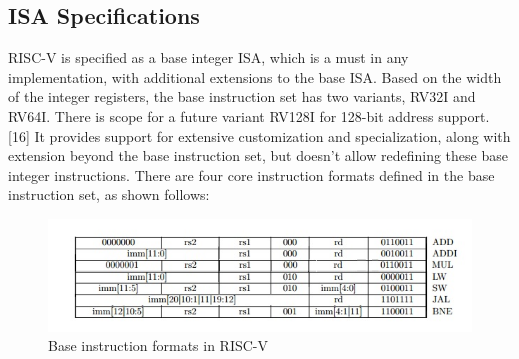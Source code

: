 \subsection{ISA Specifications}
 \label{sect6_1_2}
RISC-V is specified as a base integer ISA, which is a must in any implementation, with additional extensions to the base ISA. Based on the width of the integer registers, the base instruction set has two variants, RV32I and RV64I. There is scope for a future variant RV128I for 128-bit address support. [16] It provides support for extensive customization and specialization, along with extension beyond the base instruction set, but doesn’t allow redefining these base integer instructions. \newline\newline
There are four core instruction formats defined in the base instruction set, as shown follows:
\begin{figure}[h!]
\includegraphics[width=\linewidth]{figures/RISCV_Instruction_Formats.jpg}
\caption{Base instruction formats in RISC-V}
\label{fig:riscv1}
\end{figure}

